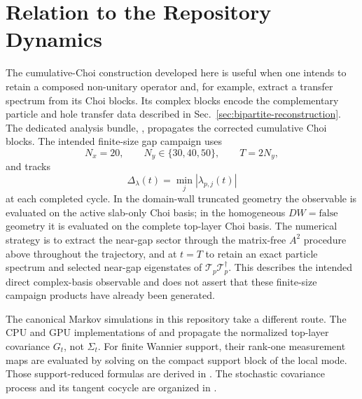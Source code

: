 \documentclass[aps,prb,onecolumn,nofootinbib,superscriptaddress]{revtex4-2}
\theoremstyle{plain}
\theoremstyle{definition}
\begin{document}
\section{Relation to the Repository Dynamics}

The cumulative-Choi construction developed here is useful when one intends to
retain a composed non-unitary operator and, for example, extract a transfer
spectrum from its Choi blocks.  Its complex blocks encode the complementary
particle and hole transfer data described in
Sec.~\ref{sec:bipartite-reconstruction}.  The dedicated analysis bundle,
, propagates the corrected
cumulative Choi blocks.  The intended finite-size gap campaign uses
\begin{equation}
  N_x=20,
  \qquad
  N_y\in\{30,40,50\},
  \qquad
  T=2N_y ,
  \label{eq:intended-gap-campaign}
\end{equation}
and tracks
\begin{equation}
  \Delta_\lambda(t)=\min_j\left|\lambda_{p,j}(t)\right|
  \label{eq:repository-gap-observable}
\end{equation}
at each completed cycle.  In the domain-wall truncated geometry the
observable is evaluated on the active slab-only Choi basis; in the
homogeneous \(DW=\mathrm{false}\) geometry it is evaluated on the complete
top-layer Choi basis.  The numerical strategy is to extract the near-gap
sector through the matrix-free \(A^2\) procedure above throughout the
trajectory, and at \(t=T\) to retain an exact particle spectrum and selected
near-gap eigenstates of \(\mathcal T_p\mathcal T_p^\dagger\).  This describes
the intended direct complex-basis observable and does not assert that these
finite-size campaign products have already been generated.

The canonical Markov simulations in this repository take a different route.
The CPU and GPU implementations of
 and
 propagate
the normalized top-layer covariance \(G_t\), not \(\Sigma_t\).  For finite
Wannier support, their rank-one measurement maps are evaluated by solving on
the compact support block of the local mode.  Those support-reduced formulas
are derived in
.  The stochastic
covariance process and its tangent cocycle are organized in
.
\end{document}
